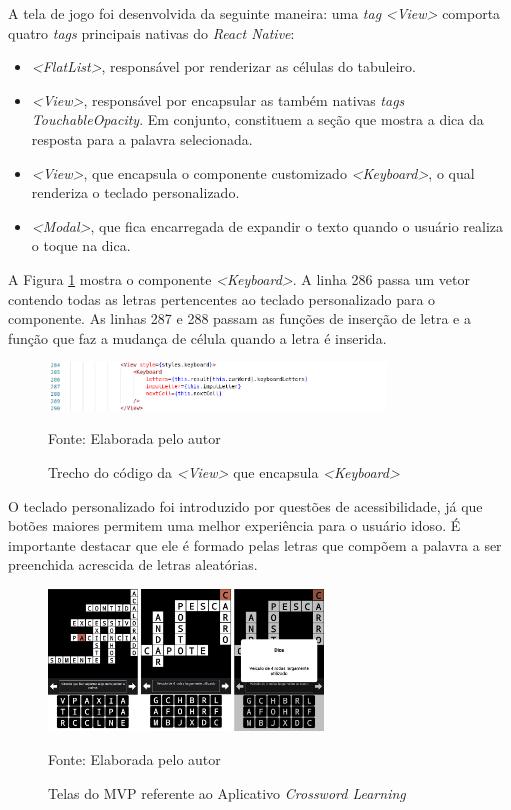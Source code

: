 A tela de jogo foi desenvolvida da seguinte maneira: uma \textit{tag} \textit{<View>} comporta quatro \textit{tags} principais nativas do \textit{React Native}:

\begin{itemize}
    \item \textit{<FlatList>}, responsável por renderizar as células do tabuleiro.
    \item \textit{<View>}, responsável por encapsular as também nativas \textit{tags} \textit{TouchableOpacity}. Em conjunto, constituem a seção que mostra a dica da resposta para a palavra selecionada. 
    \item \textit{<View>}, que encapsula o componente customizado \textit{<Keyboard>}, o qual renderiza o teclado personalizado.
    \item \textit{<Modal>}, que fica encarregada de expandir o texto quando o usuário realiza o toque na dica.
\end{itemize}

A Figura \ref{fig:keyboard} mostra o componente \textit{<Keyboard>}. A linha 286 passa um vetor contendo todas as letras pertencentes ao teclado personalizado para o componente. As linhas 287 e 288 passam as funções de inserção de letra e a função que faz a mudança de célula quando a letra é inserida. 

\begin{figure}[H]
\centering
    \caption{Trecho do código da \textit{<View>} que encapsula \textit{<Keyboard>}}
    \label{fig:keyboard}
    \includegraphics[width=0.8\textwidth]{Figuras/codeKeyboard.png}
    
    Fonte: Elaborada pelo autor
\end{figure}

O teclado personalizado foi introduzido por questões de acessibilidade, já que botões maiores permitem uma melhor experiência para o usuário idoso. É importante destacar que ele é formado pelas letras que compõem a palavra a ser preenchida acrescida de letras aleatórias.

\begin{figure}[H]
\centering
    \caption{Telas do MVP referente ao Aplicativo \textit{Crossword Learning}}
    \label{fig:mvp}
    \includegraphics[width=0.65\textwidth]{Figuras/mvp.png}
    
    Fonte: Elaborada pelo autor
\end{figure}

